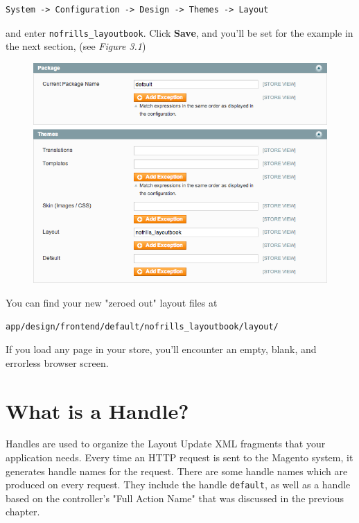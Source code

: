 \documentclass[oneside]{book}
\begin{document}
\begin{lstlisting}
System -> Configuration -> Design -> Themes -> Layout 

\end{lstlisting}


and enter \footnotesize\texttt{nofrills\_layoutbook}\normalsize. Click \textbf{Save}, and you'll be set for the example in the next section, (see \emph{Figure 3.1})

\begin{figure}[htb]
\begin{center}
\leavevmode
\includegraphics[width=1\textwidth]{images/chapter3/config-package.png}
\end{center}
\caption{}
\end{figure}


You can find your new "zeroed out" layout files at 

\begin{lstlisting}
app/design/frontend/default/nofrills_layoutbook/layout/

\end{lstlisting}


If you load any page in your store, you'll encounter an empty, blank, and errorless browser screen.

\section{What is a Handle?}

Handles are used to organize the Layout Update XML fragments that your application needs.  Every time an HTTP request is sent to the Magento system, it generates handle names for the request.  There are some handle names which are produced on every request.  They include the handle \footnotesize\texttt{default}\normalsize, as well as a handle based on the controller's "Full Action Name" that was discussed in the previous chapter.
\end{document}

